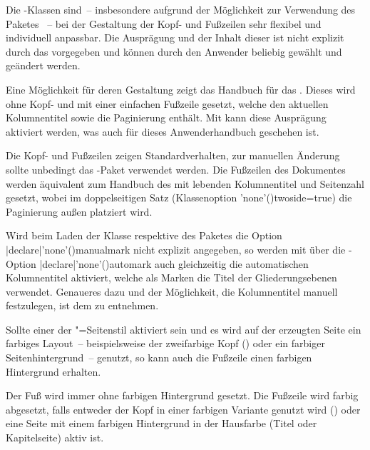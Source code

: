 \begin{DeclareEntity*}{}
\begin{DeclareEntity*}{}
\begin{DeclareEntity*}{}
\begin{Declaration}
Die \TUDScript-Klassen sind~-- insbesondere aufgrund der Möglichkeit zur 
Verwendung des Paketes ~-- bei der Gestaltung der 
Kopf- und Fußzeilen sehr flexibel und individuell anpassbar. Die Ausprägung 
und der Inhalt dieser ist nicht explizit durch das \CD vorgegeben und können 
durch den Anwender beliebig gewählt und geändert werden. 

Eine Möglichkeit für deren Gestaltung zeigt das Handbuch für das \TUDCD. Dieses 
wird ohne Kopf- und mit einer einfachen Fußzeile gesetzt, welche den aktuellen 
Kolumnentitel sowie die Paginierung enthält. Mit  kann diese 
Ausprägung aktiviert werden, was auch für dieses Anwenderhandbuch geschehen ist.
\begin{DeclareValues}{}
  Die Kopf- und Fußzeilen zeigen Standardverhalten, zur manuellen Änderung 
  sollte unbedingt das \KOMAScript-Paket  verwendet 
  werden.
  Die Fußzeilen des Dokumentes werden äquivalent zum Handbuch des \TUDCDs mit 
  lebenden Kolumnentitel und Seitenzahl gesetzt, wobei im doppelseitigen Satz 
  (Klassenoption \Option'none'(){twoside=true}) die 
  Paginierung außen platziert wird.
\end{DeclareValues}

%
Wird beim Laden der Klasse respektive des Paketes  
die Option \Option|declare|'none'(){manualmark} nicht 
explizit angegeben, so werden mit  über die 
\KOMAScript-Option \Option|declare|'none'(){automark} 
auch gleichzeitig die automatischen Kolumnentitel aktiviert, welche als Marken 
die Titel der Gliederungsebenen verwendet. Genaueres dazu und der Möglichkeit, 
die Kolumnentitel manuell festzulegen, ist dem \scrguide zu entnehmen.

%
Sollte einer der "=Seitenstil aktiviert sein und es wird 
auf der erzeugten Seite ein farbiges Layout~-- beispielsweise der zweifarbige 
Kopf () oder ein farbiger Seitenhintergrund~-- genutzt, 
so kann auch die Fußzeile einen farbigen Hintergrund erhalten.
\begin{DeclareValues}{}
  Der Fuß wird immer ohne farbigen Hintergrund gesetzt.
  Die Fußzeile wird farbig abgesetzt, falls entweder der Kopf in einer farbigen
  Variante genutzt wird () oder eine Seite mit einem 
  farbigen Hintergrund in der Hausfarbe (Titel oder Kapitelseite) aktiv ist.
\end{DeclareValues}


\end{Declaration}
\end{DeclareEntity*}
\end{DeclareEntity*}
\end{DeclareEntity*}
